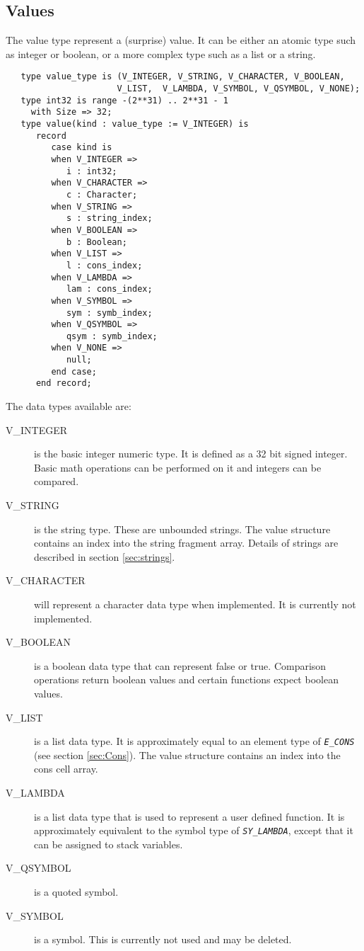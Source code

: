 \documentclass[10pt, openany]{book}
\newcommand{\constant}[1]{\emph{\texttt{#1}}}
\begin{document}
\subsection{Values}
\label{sec:Values}
The value type represent a (surprise) value.  It can be either an atomic type such as integer or boolean, or a more complex type such as a list or a string.  
\begin{lstlisting}
   type value_type is (V_INTEGER, V_STRING, V_CHARACTER, V_BOOLEAN,
                      V_LIST,  V_LAMBDA, V_SYMBOL, V_QSYMBOL, V_NONE);
   type int32 is range -(2**31) .. 2**31 - 1
     with Size => 32;
   type value(kind : value_type := V_INTEGER) is
      record
         case kind is
         when V_INTEGER =>
            i : int32;
         when V_CHARACTER =>
            c : Character;
         when V_STRING =>
            s : string_index;
         when V_BOOLEAN =>
            b : Boolean;
         when V_LIST =>
            l : cons_index;
         when V_LAMBDA =>
            lam : cons_index;
         when V_SYMBOL =>
            sym : symb_index;
         when V_QSYMBOL =>
            qsym : symb_index;
         when V_NONE =>
            null;
         end case;
      end record;
\end{lstlisting}

The data types available are:
\begin{description}
  \item[V\_INTEGER] is the basic integer numeric type.  It is defined as a 32 bit signed integer.  Basic math operations can be performed on it and integers can be compared.
  \item[V\_STRING] is the string type.  These are unbounded strings.  The value structure contains an index into the string fragment array.  Details of strings are described in section \ref{sec:strings}.
  \item[V\_CHARACTER] will represent a character data type when implemented.  It is currently not implemented.
  \item[V\_BOOLEAN] is a boolean data type that can represent false or true.  Comparison operations return boolean values and certain functions expect boolean values.
  \item[V\_LIST] is a list data type.  It is approximately equal to an element type of \constant{E\_CONS} (see section \ref{sec:Cons}).  The value structure contains an index into the cons cell array.
  \item[V\_LAMBDA] is a list data type that is used to represent a user defined function.  It is approximately equivalent to the symbol type of \constant{SY\_LAMBDA}, except that it can be assigned to stack variables.
  \item[V\_QSYMBOL] is a quoted symbol.
  \item[V\_SYMBOL] is a symbol.  This is currently not used and may be deleted.
\end{description}
\end{document}
